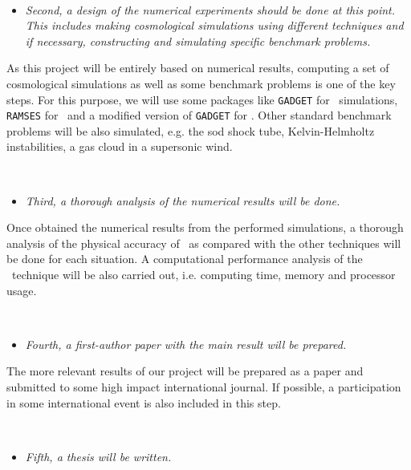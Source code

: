 \documentclass[a4,useAMS,usenatbib,usegraphicx,12pt]{article}
\begin{document}
\

\begin{itemize}
\item[\checkmark] \textit{Second, a design of the numerical experiments should 
be done at this point. This includes making cosmological simulations using 
different techniques and if necessary, constructing and simulating specific 
benchmark problems.}
\end{itemize}


As this project will be entirely based on numerical results, computing a set of
cosmological simulations as well as some benchmark problems is one of the key 
steps. For this purpose, we will use some packages like \texttt{GADGET} 
\citep{Springel05} for \SPH\ simulations, \texttt{RAMSES} \citet{Teyssier02} 
for \AMR\ and a modified version of \texttt{GADGET} for \VPH. Other standard 
benchmark problems will be also simulated, e.g. the sod shock tube, 
Kelvin-Helmholtz instabilities, a gas cloud in a supersonic wind.

\

\begin{itemize}
\item[\checkmark] \textit{Third, a thorough analysis of the numerical results 
will be done.}
\end{itemize}


Once obtained the numerical results from the performed simulations, a thorough
analysis of the physical accuracy of \VPH\ as compared with the other techniques
will be done for each situation. A computational performance analysis of the 
\VPH\ technique will be also carried out, i.e. computing time, memory and 
processor usage.

\

\begin{itemize}
\item[\checkmark] \textit{Fourth, a first-author paper with the main result will
be prepared.}
\end{itemize}


The more relevant results of our project will be prepared as a paper and 
submitted to some high impact international journal. If possible, a participation
in some international event is also included in this step.

\

\begin{itemize}
\item[\checkmark] \textit{Fifth, a thesis will be written.}
\end{itemize}
\end{document}
